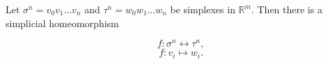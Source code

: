 Let $\sigma^n = v_0v_1 \ldots v_n$ and $\tau^n = w_0w_1 \ldots w_n$ be simplexes in $\mathbb{R}^m$. Then there is a simplicial homeomorphism

$$f: \sigma^n \leftrightarrow \tau^n,$$
$$f: v_i \mapsto w_i.$$
